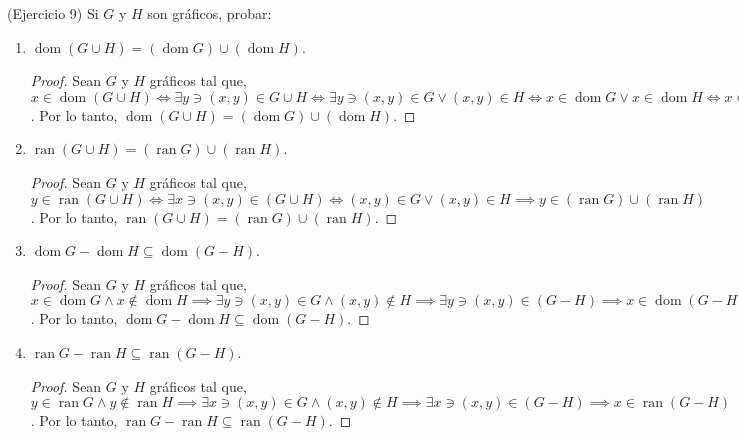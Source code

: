 \begin{problema}(Ejercicio 9)
	Si $G$ y $H$ son gráficos, probar: 
	\begin{enumerate}
		\item $\operatorname{dom}(G \cup H)=(\operatorname{dom} G) \cup(\operatorname{dom} H)$.
		\begin{proof}
			Sean $G$ y $H$ gráficos tal que, $x\in \operatorname{dom}(G\cup H)\iff \exists y \ni (x,y)\in G\cup H \iff \exists y \ni (x,y)\in G\vee (x,y)\in H \iff x\in \operatorname{dom} G \vee x\in \operatorname{dom} H \iff x\in  (\operatorname{dom} G) \cup(\operatorname{dom} H)$. Por lo tanto, $\operatorname{dom}(G \cup H)=(\operatorname{dom} G) \cup(\operatorname{dom} H)$.
		\end{proof}
		\item $\operatorname{ran}(G \cup H)=(\operatorname{ran} G) \cup(\operatorname{ran} H)$.
		\begin{proof}
				Sean $G$ y $H$ gráficos tal que, $y\in \operatorname{ran}(G \cup H) \iff \exists x \ni (x,y)\in (G \cup H)\iff (x,y)\in G\vee (x,y)\in H\implies y\in(\operatorname{ran} G) \cup(\operatorname{ran} H) $. Por lo tanto, $\operatorname{ran}(G \cup H)=(\operatorname{ran} G) \cup(\operatorname{ran} H)$.
		\end{proof}
		\item $\operatorname{dom} G-\operatorname{dom} H \subseteq \operatorname{dom}(G-H)$.
		\begin{proof}
				Sean $G$ y $H$ gráficos tal que, $x\in \operatorname{dom} G\wedge x\not\in \operatorname{dom} H \implies \exists y \ni (x,y)\in G\wedge (x,y)\not\in H\implies \exists y \ni (x,y)\in (G-H) \implies x\in \operatorname{dom}(G-H)$. Por lo tanto, $\operatorname{dom} G-\operatorname{dom} H \subseteq \operatorname{dom}(G-H)$.
		\end{proof}
		\item $\operatorname{ran} G-\operatorname{ran} H \subseteq \operatorname{ran}(G-H)$.
		\begin{proof}
				Sean $G$ y $H$ gráficos tal que, $y\in \operatorname{ran} G\wedge y\not\in \operatorname{ran} H \implies \exists x \ni (x,y)\in G\wedge (x,y)\not\in H\implies \exists x \ni (x,y)\in (G-H) \implies x\in \operatorname{ran}(G-H)$. Por lo tanto, $\operatorname{ran} G-\operatorname{ran} H \subseteq \operatorname{ran}(G-H)$.
		\end{proof}
	\end{enumerate}

\end{problema}




